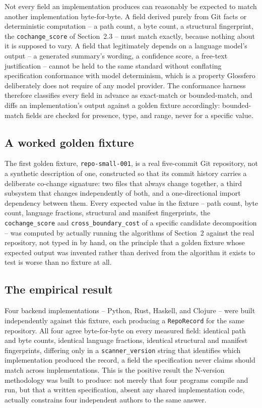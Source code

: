 \documentclass[11pt]{article}
\begin{document}
Not every field an implementation produces can reasonably be expected to match another implementation byte-for-byte. A field derived purely from Git facts or deterministic computation -- a path count, a byte count, a structural fingerprint, the \texttt{cochange\_score} of Section~2.3 -- must match exactly, because nothing about it is supposed to vary. A field that legitimately depends on a language model's output -- a generated summary's wording, a confidence score, a free-text justification -- cannot be held to the same standard without conflating specification conformance with model determinism, which is a property Glossfero deliberately does not require of any model provider. The conformance harness therefore classifies every field in advance as exact-match or bounded-match, and diffs an implementation's output against a golden fixture accordingly: bounded-match fields are checked for presence, type, and range, never for a specific value.

\subsection{A worked golden fixture}

The first golden fixture, \texttt{repo-small-001}, is a real five-commit Git repository, not a synthetic description of one, constructed so that its commit history carries a deliberate co-change signature: two files that always change together, a third subsystem that changes independently of both, and a one-directional import dependency between them. Every expected value in the fixture -- path count, byte count, language fractions, structural and manifest fingerprints, the \texttt{cochange\_score} and \texttt{cross\_boundary\_cost} of a specific candidate decomposition -- was computed by actually running the algorithms of Section~2 against the real repository, not typed in by hand, on the principle that a golden fixture whose expected output was invented rather than derived from the algorithm it exists to test is worse than no fixture at all.

\subsection{The empirical result}

Four backend implementations -- Python, Rust, Haskell, and Clojure -- were built independently against this fixture, each producing a \texttt{RepoRecord} for the same repository. All four agree byte-for-byte on every measured field: identical path and byte counts, identical language fractions, identical structural and manifest fingerprints, differing only in a \texttt{scanner\_version} string that identifies which implementation produced the record, a field the specification never claims should match across implementations. This is the positive result the N-version methodology was built to produce: not merely that four programs compile and run, but that a written specification, absent any shared implementation code, actually constrains four independent authors to the same answer.
\end{document}
